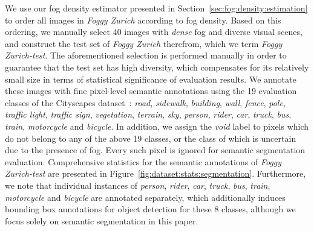 \documentclass[twocolumn]{svjour3}          \smartqed  \usepackage{graphicx}
\begin{document}
We use our fog density estimator presented in Section~\ref{sec:fog:density:estimation} to order all images in \emph{Foggy Zurich} according to fog density. Based on this ordering, we manually select 40 images with \emph{dense} fog and diverse visual scenes, and construct the test set of \emph{Foggy Zurich} therefrom, which we term \emph{Foggy Zurich-test}. The aforementioned selection is performed manually in order to guarantee that the test set has high diversity, which compensates for its relatively small size in terms of statistical significance of evaluation results. We annotate these images with fine pixel-level semantic annotations using the 19 evaluation classes of the Cityscapes dataset~\cite{Cityscapes}: \emph{road}, \emph{sidewalk}, \emph{building}, \emph{wall}, \emph{fence}, \emph{pole}, \emph{traffic light}, \emph{traffic sign}, \emph{vegetation}, \emph{terrain}, \emph{sky}, \emph{person}, \emph{rider}, \emph{car}, \emph{truck}, \emph{bus}, \emph{train}, \emph{motorcycle} and \emph{bicycle}. In addition, we assign the \emph{void} label to pixels which do not belong to any of the above 19 classes, or the class of which is uncertain due to the presence of fog. Every such pixel is ignored for semantic segmentation evaluation. Comprehensive statistics for the semantic annotations of \emph{Foggy Zurich-test} are presented in Figure~\ref{fig:dataset:stats:segmentation}. Furthermore, we note that individual instances of \emph{person}, \emph{rider}, \emph{car}, \emph{truck}, \emph{bus}, \emph{train}, \emph{motorcycle} and \emph{bicycle} are annotated separately, which additionally induces bounding box annotations for object detection for these 8 classes, although we focus solely on semantic segmentation in this paper. 
\end{document}
